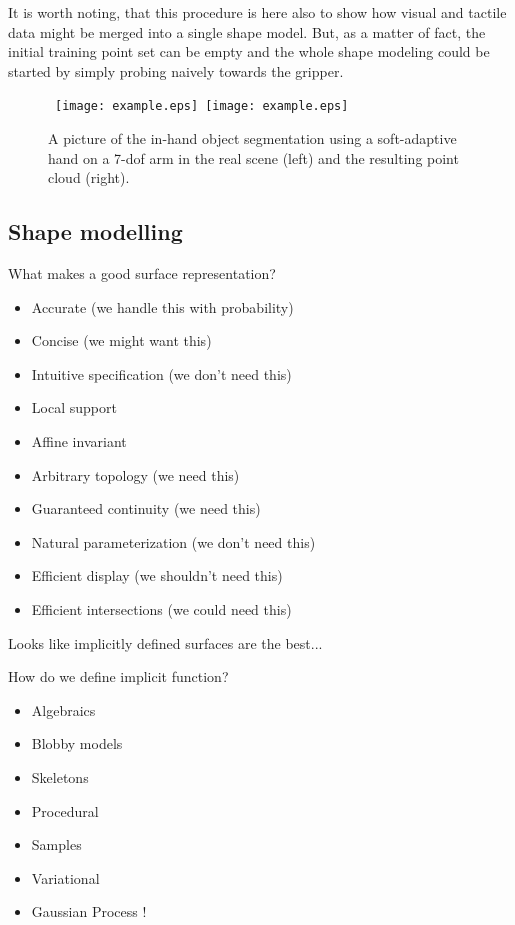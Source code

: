 It is worth noting, that this procedure is here also to show how visual and tactile
data might  be merged into a  single shape model.
But,  as a matter of  fact, the
initial training  point set  can be  empty and the whole shape modeling could be 
started  by simply  probing naively towards the gripper.

\begin{figure}
\centering
  \mbox{
  \texttt{[image: example.eps]}
  \texttt{[image: example.eps]}
  }
  \caption{A picture of the in-hand object segmentation using a soft-adaptive hand on a 7-dof arm in the real scene (left) and the resulting point cloud (right).}
  \label{fig:in-hand-segmentation}
\end{figure}



\subsection{Shape modelling}
\label{sec:shape}
What makes a good surface representation?
\begin{itemize}
\item Accurate (we handle this with probability)
\item Concise (we might want this)
\item Intuitive specification (we don't need this)
\item Local support
\item Affine invariant 
\item Arbitrary topology (we need this)
\item Guaranteed continuity (we need this)
\item Natural parameterization (we don't need this)
\item Efficient display (we shouldn't need this)
\item Efficient intersections (we could need this)
\end{itemize}

Looks like implicitly defined surfaces are the best...

How do we define implicit function?
\begin{itemize}
\item Algebraics
\item Blobby models
\item Skeletons
\item Procedural
\item Samples
\item Variational
\item Gaussian Process !
\end{itemize}

